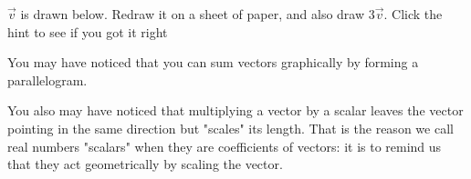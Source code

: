 \documentclass{ximera}
\begin{document}
\begin{question}
  \begin{hint}
\begin{center}
\end{center}
  \end{hint}
  $\vec{v}$ is drawn below.  Redraw it on a sheet of paper, and also draw $3\vec{v}$.  Click the hint to see if you got it right

\begin{center}
\end{center}
\end{question}

You may have noticed that you can sum vectors graphically by forming a
parallelogram.

  		You also may have noticed that multiplying a vector by a scalar leaves the vector pointing in the same direction but "scales" its length.  That is the reason we call real
  		numbers  "scalars" when they are coefficients of vectors:  it is to remind us that they act geometrically by scaling the vector.
\end{document}
